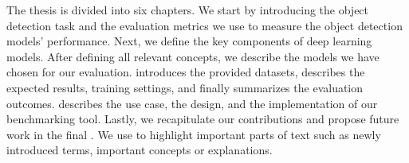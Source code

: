 The thesis is divided into six chapters. We start by introducing the object
detection task and the evaluation metrics we use to measure the object detection
models' performance. Next, we define the key components of deep learning models.
After defining all relevant concepts, we describe the models we have
chosen for our evaluation.  introduces the
provided datasets, describes the expected
results, training settings, and finally summarizes the evaluation outcomes.
 describes the use case, the design, and the
implementation of our benchmarking tool. Lastly, we recapitulate our
contributions and propose future work in the final
. We use  to highlight important
parts of text such as newly introduced terms, important concepts or explanations.

